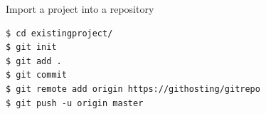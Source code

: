 \begin{frame}[c,fragile]{Import a project into a repository}

\begin{center}
\begin{minipage}{\textwidth}

\begin{listing}[H]
\begin{verbatim}
$ cd existingproject/
$ git init
$ git add .
$ git commit
$ git remote add origin https://githosting/gitrepo
$ git push -u origin master
\end{verbatim}
\end{listing}

\end{minipage}
\end{center}

\end{frame}
